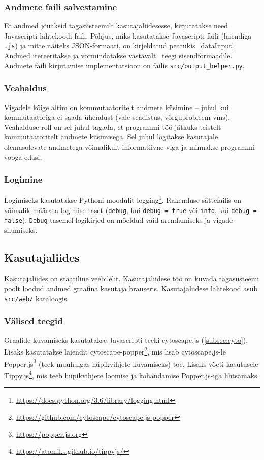 \documentclass[12pt]{article}
\begin{document}
\subsubsection{Andmete faili salvestamine} \label{backendOutput}
Et andmed jõuaksid tagasüsteemilt kasutajaliidesesse, kirjutatakse need Javascripti lähtekoodi
faili.
Põhjus, miks kasutatakse Javascripti faili (laiendiga \texttt{.js}) ja mitte näiteks JSON-formaati,
on kirjeldatud peatükis~\ref{dataInput}.
Andmed itereeritakse ja vormindatakse vastavalt~ teegi sisendformaadile.
Andmete faili kirjutamise implementatsioon on failis \texttt{src/output\_helper.py}.

\subsubsection{Veahaldus}
Vigadele kõige altim on kommutaatoritelt andmete küsimine -- juhul kui kommutaatoriga ei saada
ühendust (vale seadistus, võrguprobleem vms).
Veahalduse roll on sel juhul tagada, et programmi töö jätkuks teistelt kommutaatoritelt andmete
küsimisega.
Sel juhul logitakse kasutajale olemasolevate andmetega võimalikult informatiivne viga ja minnakse
programmi vooga edasi.

\subsubsection{Logimine} \label{logging}
Logimiseks kasutatakse Pythoni moodulit
logging\footnote{\url{https://docs.python.org/3.6/library/logging.html}}.
Rakenduse sättefailis on võimalik määrata logimise taset (\texttt{debug},
kui \texttt{debug = true} või \texttt{info}, kui \texttt{debug = false}).
\texttt{Debug} tasemel logikirjed on mõeldud vaid arendamiseks ja vigade silumiseks.


\subsection{Kasutajaliides}
Kasutajaliides on staatiline veebileht.
Kasutajaliidese töö on kuvada tagasüsteemi poolt loodud andmed graafina kasutaja brauseris.
Kasutajaliidese lähtekood asub \texttt{src/web/} kataloogis.

\subsubsection{Välised teegid} \label{libsUsedInUI}
Graafide kuvamiseks kasutatakse Javascripti teeki cytoscape.js (\ref{subsec:cyto}).
Lisaks kasutatakse laiendit
cytoscape-popper\footnote{\url{https://github.com/cytoscape/cytoscape.js-popper}}, mis lisab
cytoscape.js-le Popper.js\footnote{\url{https://popper.js.org}} (teek muuhulgas hüpikvihjete
kuvamiseks) toe.
Lisaks võeti kasutusele Tippy.js\footnote{\url{https://atomiks.github.io/tippyjs/}},
mis teeb hüpikvihjete loomise ja kohandamise Popper.js-iga lihtsamaks.
\end{document}
